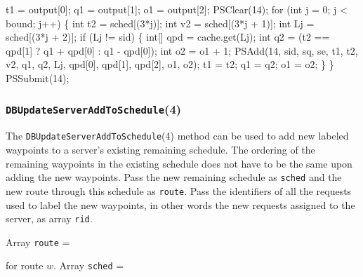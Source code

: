 \documentclass{article}
\def\nwendcode{\endtrivlist \endgroup}
\let\nwdocspar=\par
\theoremstyle{definition}
\begin{document}
t1 = output[0];
q1 = output[1];
o1 = output[2];
PSClear(14);
for (int j = 0; j < bound; j++) \{
  int t2 = sched[(3*j)];
  int v2 = sched[(3*j + 1)];
  int Lj = sched[(3*j + 2)];
  if (Lj != sid) \{
    int[] qpd = cache.get(Lj);
    int q2 = (t2 == qpd[1] ? q1 + qpd[0] : q1 - qpd[0]);
    int o2 = o1 + 1;
    PSAdd(14, sid, sq, se, t1, t2, v2, q1, q2, Lj,
          qpd[0], qpd[1], qpd[2], o1, o2);
    t1 = t2;
    q1 = q2;
    o1 = o2;
  \}
\}
PSSubmit(14);
\nwendcode{}\nwdocspar

\subsubsection{{\tt{}\protect{}DBUpdateServerAddToSchedule}(4)}
The {\tt{}\protect{}DBUpdateServerAddToSchedule}(4) method can be used to add new labeled
waypoints to a server's existing remaining schedule. The ordering of the
remaining waypoints in the existing schedule does not have to be the same
upon adding the new waypoints. Pass the new remaining schedule as {\tt{}sched} and
the new route through this schedule as {\tt{}route}. Pass the identifiers of all
the requests used to label the new waypoints, in other words the new
requests assigned to the server, as array {\tt{}rid}.

Array {\tt{}route} =

\noindent
{}

\noindent for route $w$. Array {\tt{}sched} =

\noindent
{}
\end{document}

